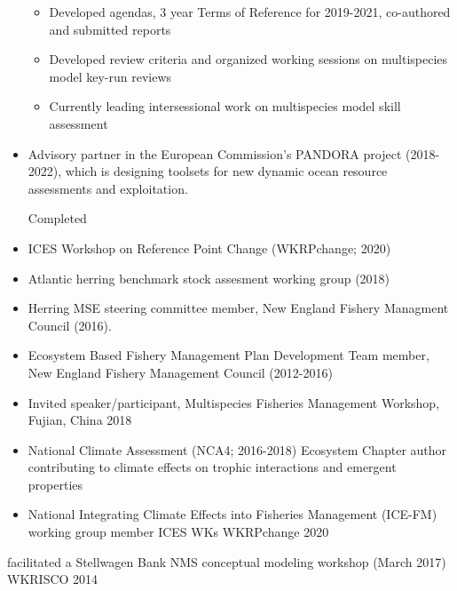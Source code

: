 \documentclass[11pt, a4paper]{awesome-cv}
\providecommand{\tightlist}{%
	\setlength{\itemsep}{0pt}\setlength{\parskip}{0pt}}
\begin{document}
\begin{itemize}
  \begin{itemize}
  \tightlist
  \item
    Developed agendas, 3 year Terms of Reference for 2019-2021,
    co-authored and submitted reports
  \item
    Developed review criteria and organized working sessions on
    multispecies model key-run reviews
  \item
    Currently leading intersessional work on multispecies model skill
    assessment
  \end{itemize}
\item
  Advisory partner in the European Commission's PANDORA project
  (2018-2022), which is designing toolsets for new dynamic ocean
  resource assessments and exploitation.

  Completed
\item
  ICES Workshop on Reference Point Change (WKRPchange; 2020)\\
\item
  Atlantic herring benchmark stock assesment working group (2018)
\item
  Herring MSE steering committee member, New England Fishery Managment
  Council (2016).
\item
  Ecosystem Based Fishery Management Plan Development Team member, New
  England Fishery Management Council (2012-2016)
\item
  Invited speaker/participant, Multispecies Fisheries Management
  Workshop, Fujian, China 2018
\item
  National Climate Assessment (NCA4; 2016-2018) Ecosystem Chapter author
  contributing to climate effects on trophic interactions and emergent
  properties
\item
  National Integrating Climate Effects into Fisheries Management
  (ICE-FM) working group member ICES WKs WKRPchange 2020
\end{itemize}

facilitated a Stellwagen Bank NMS conceptual modeling workshop (March
2017) WKRISCO 2014
\end{document}
